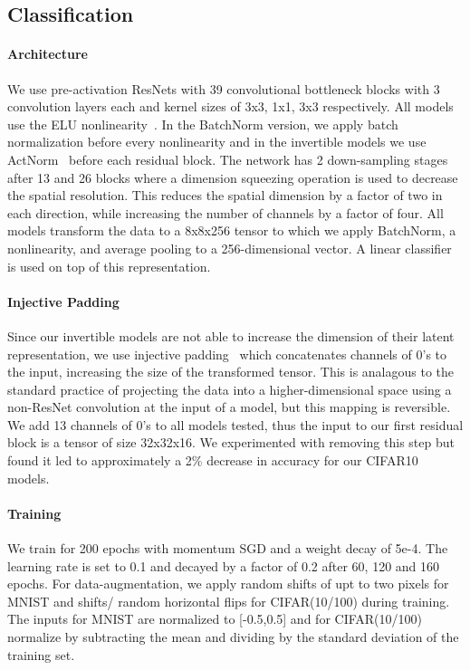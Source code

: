 \documentclass{article}
\begin{document}
\subsection{Classification}
\label{sec:class_details}
\paragraph{Architecture} We use pre-activation ResNets with 39 convolutional bottleneck blocks with 3 convolution layers each and kernel sizes of 3x3, 1x1, 3x3 respectively. All models use the ELU nonlinearity~\citep{DBLP:journals/corr/ClevertUH15}. In the BatchNorm version, we apply batch normalization before every nonlinearity and in the invertible models we use ActNorm~\citep{kingma2018glow} before each residual block. The network has 2 down-sampling stages after 13 and 26 blocks where a dimension squeezing operation is used to decrease the spatial resolution. This reduces the spatial dimension by a factor of two in each direction, while increasing the number of channels by a factor of four. All models transform the data to a 8x8x256 tensor to which we apply BatchNorm, a nonlinearity, and average pooling to a 256-dimensional vector. A linear classifier is used on top of this representation. 

\paragraph{Injective Padding} Since our invertible models are not able to increase the dimension of their latent representation, we use injective padding~\citep{jacobsen2018irevnet} which concatenates channels of 0's to the input, increasing the size of the transformed tensor. This is analagous to the standard practice of projecting the data into a higher-dimensional space using a non-ResNet convolution at the input of a model, but this mapping is reversible. We add 13 channels of 0's to all models tested, thus the input to our first residual block is a tensor of size 32x32x16. We experimented with removing this step but found it led to approximately a 2\% decrease in accuracy for our CIFAR10 models. 



\paragraph{Training} We train for 200 epochs with momentum SGD and a weight decay of 5e-4. The learning rate is set to 0.1 and decayed by a factor of 0.2 after 60, 120 and 160 epochs. For data-augmentation, we apply random shifts of upt to two pixels for MNIST and shifts/ random horizontal flips for CIFAR(10/100) during training. The inputs for MNIST are normalized to [-0.5,0.5] and for CIFAR(10/100) normalize by subtracting the mean and dividing by the standard deviation of the training set. 
\end{document}
